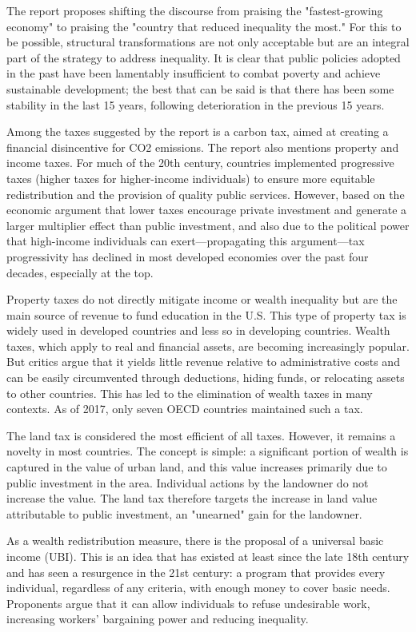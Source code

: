 The report proposes shifting the discourse from praising the "fastest-growing economy" to praising the "country that reduced inequality the most." For this to be possible, structural transformations are not only acceptable but are an integral part of the strategy to address inequality. It is clear that public policies adopted in the past have been lamentably insufficient to combat poverty and achieve sustainable development; the best that can be said is that there has been some stability in the last 15 years, following deterioration in the previous 15 years.

Among the taxes suggested by the report is a carbon tax, aimed at creating a financial disincentive for CO2 emissions. The report also mentions property and income taxes. For much of the 20th century, countries implemented progressive taxes (higher taxes for higher-income individuals) to ensure more equitable redistribution and the provision of quality public services. However, based on the economic argument that lower taxes encourage private investment and generate a larger multiplier effect than public investment, and also due to the political power that high-income individuals can exert—propagating this argument—tax progressivity has declined in most developed economies over the past four decades, especially at the top.

Property taxes do not directly mitigate income or wealth inequality but are the main source of revenue to fund education in the U.S. This type of property tax is widely used in developed countries and less so in developing countries. Wealth taxes, which apply to real and financial assets, are becoming increasingly popular. But critics argue that it yields little revenue relative to administrative costs and can be easily circumvented through deductions, hiding funds, or relocating assets to other countries. This has led to the elimination of wealth taxes in many contexts. As of 2017, only seven OECD countries maintained such a tax.

The land tax is considered the most efficient of all taxes. However, it remains a novelty in most countries. The concept is simple: a significant portion of wealth is captured in the value of urban land, and this value increases primarily due to public investment in the area. Individual actions by the landowner do not increase the value. The land tax therefore targets the increase in land value attributable to public investment, an "unearned" gain for the landowner.

As a wealth redistribution measure, there is the proposal of a universal basic income (UBI). This is an idea that has existed at least since the late 18th century and has seen a resurgence in the 21st century: a program that provides every individual, regardless of any criteria, with enough money to cover basic needs. Proponents argue that it can allow individuals to refuse undesirable work, increasing workers' bargaining power and reducing inequality.

